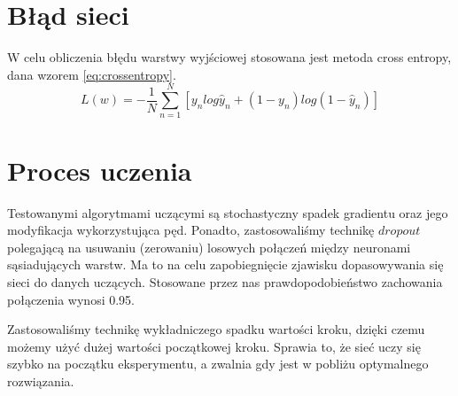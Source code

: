 \section{Błąd sieci}
W celu obliczenia błędu warstwy wyjściowej stosowana jest metoda cross entropy, dana wzorem \ref{eq:crossentropy}.
\begin{equation} \label{eq:crossentropy}
L(w) = -\frac{1}{N} \sum\limits_{n=1}^N [y_nlog\hat{y}_n + (1-y_n)log(1-\hat{y}_n)]
\end{equation}

\section{Proces uczenia}
Testowanymi algorytmami uczącymi są stochastyczny spadek gradientu oraz jego modyfikacja wykorzystująca pęd. Ponadto, zastosowaliśmy technikę $dropout$ polegającą na usuwaniu (zerowaniu) losowych połączeń między neuronami sąsiadujących warstw. Ma to na celu zapobiegnięcie zjawisku dopasowywania się sieci do danych uczących. Stosowane przez nas prawdopodobieństwo zachowania połączenia wynosi \num{0,95}. 

Zastosowaliśmy technikę wykładniczego spadku wartości kroku, dzięki czemu możemy użyć dużej wartości początkowej kroku. Sprawia to, że sieć uczy się szybko na początku eksperymentu, a zwalnia gdy jest w pobliżu optymalnego rozwiązania.